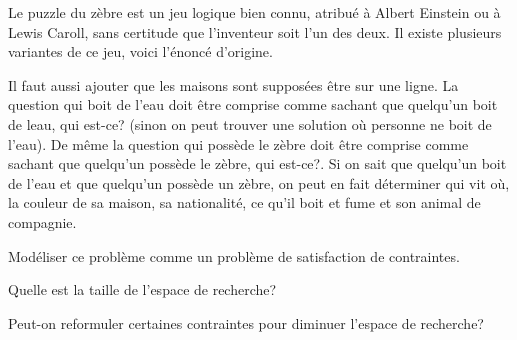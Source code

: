 \begin{td-exo}
    Le puzzle du zèbre est un jeu logique bien connu, atribué à Albert Einstein
    ou à Lewis Caroll, sans certitude que l'inventeur soit l'un des deux. Il
    existe plusieurs variantes de ce jeu, voici l'énoncé d'origine.
    

    Il faut aussi ajouter que les maisons sont supposées être sur une ligne. La
    question \og{}qui boit de l'eau\fg{} doit être comprise comme \og{}sachant que
    quelqu'un boit de leau, qui est-ce?\fg{} (sinon on peut trouver une solution
    où personne ne boit de l'eau). De même la question \og{}qui possède le zèbre\fg{} 
    doit être comprise comme \og{}sachant que quelqu'un possède le zèbre, qui est-ce?\fg{}.
    Si on sait que quelqu'un boit de l'eau et que quelqu'un possède un zèbre, on peut 
    en fait déterminer qui vit où, la couleur de sa maison, sa nationalité, ce qu'il 
    boit et fume et son animal de compagnie.

    Modéliser ce problème comme un problème de satisfaction de contraintes.

    Quelle est la taille de l'espace de recherche?

    Peut-on reformuler certaines contraintes pour diminuer l'espace de recherche?
\end{td-exo}


